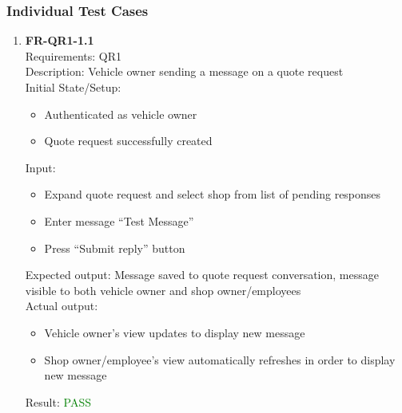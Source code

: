 \documentclass[12pt, titlepage]{article}
\newcommand{\testpass}{\textcolor{green}{PASS}}
\begin{document}
        \subsubsection{Individual Test Cases}
            \begin{enumerate}
                \item \textbf{FR-QR1-1.1} \label{FR-QR1-1.1} \\ Requirements: QR1 \\
                    Description: Vehicle owner sending a message on a quote request \\
                    Initial State/Setup: \begin{itemize}
                        \item Authenticated as vehicle owner
                        \item Quote request successfully created
                    \end{itemize}
                    Input: \begin{itemize}
                        \item Expand quote request and select shop from list of pending responses
                        \item Enter message ``Test Message''
                        \item Press ``Submit reply'' button
                    \end{itemize}
                    Expected output: Message saved to quote request conversation, message visible to both vehicle owner and shop owner/employees \\
                    Actual output: \begin{itemize}
                        \item Vehicle owner's view updates to display new message
                        \item Shop owner/employee's view automatically refreshes in order to display new message
                    \end{itemize}
                    Result: \testpass


\end{enumerate}
\end{document}

